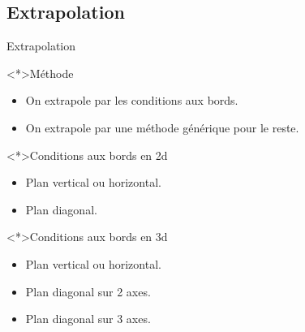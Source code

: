 \subsection{Extrapolation}
\begin{frame}[<+->]{Extrapolation}
 
 \begin{block}<*>{Méthode}
  \begin{itemize}
   \item On extrapole par les conditions aux bords.
   \item On extrapole par une méthode générique pour le reste.
  \end{itemize}

 \end{block}
 
 \begin{block}<*>{Conditions aux bords en 2d}
  \begin{itemize}
   \item Plan vertical ou horizontal.
   \item Plan diagonal.
  \end{itemize}

 \end{block}
 
 \begin{block}<*>{Conditions aux bords en 3d}
  \begin{itemize}
   \item Plan vertical ou horizontal.
   \item Plan diagonal sur 2 axes.
   \item Plan diagonal sur 3 axes.
  \end{itemize}

 \end{block}


\end{frame}

